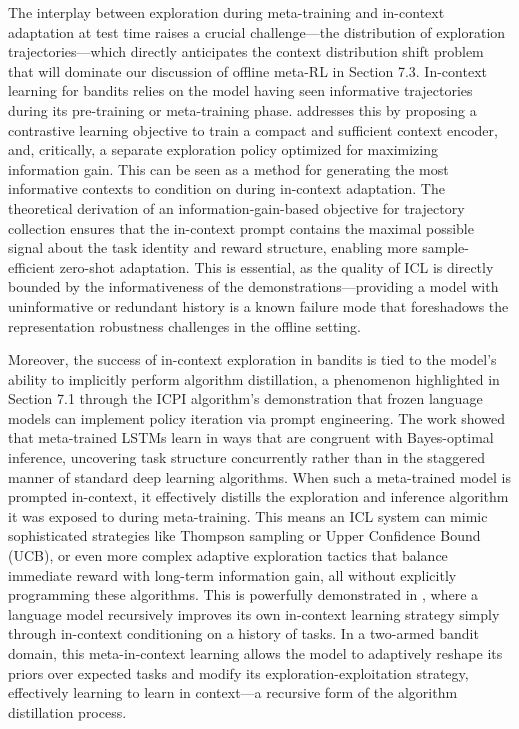 \documentclass[11pt]{article}
\begin{document}
The interplay between exploration during meta-training and in-context adaptation at test time raises a crucial challenge---the distribution of exploration trajectories---which directly anticipates the context distribution shift problem that will dominate our discussion of offline meta-RL in Section 7.3. In-context learning for bandits relies on the model having seen informative trajectories during its pre-training or meta-training phase. \cite{ref310} addresses this by proposing a contrastive learning objective to train a compact and sufficient context encoder, and, critically, a separate exploration policy optimized for maximizing information gain. This can be seen as a method for generating the most informative contexts to condition on during in-context adaptation. The theoretical derivation of an information-gain-based objective for trajectory collection ensures that the in-context prompt contains the maximal possible signal about the task identity and reward structure, enabling more sample-efficient zero-shot adaptation. This is essential, as the quality of ICL is directly bounded by the informativeness of the demonstrations---providing a model with uninformative or redundant history is a known failure mode that foreshadows the representation robustness challenges in the offline setting.

Moreover, the success of in-context exploration in bandits is tied to the model's ability to implicitly perform algorithm distillation, a phenomenon highlighted in Section 7.1 through the ICPI algorithm's demonstration that frozen language models can implement policy iteration via prompt engineering. The work \cite{ref328} showed that meta-trained LSTMs learn in ways that are congruent with Bayes-optimal inference, uncovering task structure concurrently rather than in the staggered manner of standard deep learning algorithms. When such a meta-trained model is prompted in-context, it effectively distills the exploration and inference algorithm it was exposed to during meta-training. This means an ICL system can mimic sophisticated strategies like Thompson sampling or Upper Confidence Bound (UCB), or even more complex adaptive exploration tactics that balance immediate reward with long-term information gain, all without explicitly programming these algorithms. This is powerfully demonstrated in \cite{ref329}, where a language model recursively improves its own in-context learning strategy simply through in-context conditioning on a history of tasks. In a two-armed bandit domain, this meta-in-context learning allows the model to adaptively reshape its priors over expected tasks and modify its exploration-exploitation strategy, effectively learning to learn in context---a recursive form of the algorithm distillation process.
\end{document}
